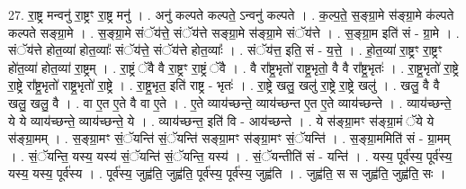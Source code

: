 \documentclass[17pt]{extarticle}
\begin{document}
27. रा॒ष्ट्र मन्वनु॑ रा॒ष्ट्रꣳ रा॒ष्ट्र मनु॑ । . अनु॑ कल्पते कल्पते॒ ऽन्वनु॑ कल्पते । . क॒ल्प॒ते॒ स॒ङ्ग्रा॒मे स॑ङ्ग्रा॒मे क॑ल्पते कल्पते सङ्ग्रा॒मे । . स॒ङ्ग्रा॒मे संॅय॑त्ते॒ संॅय॑त्ते सङ्ग्रा॒मे स॑ङ्ग्रा॒मे संॅय॑त्ते । . स॒ङ्ग्रा॒म इति॑ सं - ग्रा॒मे । . संॅय॑त्ते होत॒व्या॑ होत॒व्याः᳚ संॅय॑त्ते॒ संॅय॑त्ते होत॒व्याः᳚ । . संॅय॑त्त॒ इति॒ सं - य॒त्ते॒ । . हो॒त॒व्या॑ रा॒ष्ट्रꣳ रा॒ष्ट्रꣳ हो॑त॒व्या॑ होत॒व्या॑ रा॒ष्ट्रम् । . रा॒ष्ट्रं ॅवै वै रा॒ष्ट्रꣳ रा॒ष्ट्रं ॅवै । . वै रा᳚ष्ट्र॒भृतो॑ राष्ट्र॒भृतो॒ वै वै रा᳚ष्ट्र॒भृतः॑ । . रा॒ष्ट्र॒भृतो॑ रा॒ष्ट्रे रा॒ष्ट्रे रा᳚ष्ट्र॒भृतो॑ राष्ट्र॒भृतो॑ रा॒ष्ट्रे । . रा॒ष्ट्र॒भृत॒ इति॑ राष्ट्र - भृतः॑ । . रा॒ष्ट्रे खलु॒ खलु॑ रा॒ष्ट्रे रा॒ष्ट्रे खलु॑ । . खलु॒ वै वै खलु॒ खलु॒ वै । . वा ए॒त ए॒ते वै वा ए॒ते । . ए॒ते व्याय॑च्छन्ते॒ व्याय॑च्छन्त ए॒त ए॒ते व्याय॑च्छन्ते । . व्याय॑च्छन्ते॒ ये ये व्याय॑च्छन्ते॒ व्याय॑च्छन्ते॒ ये । . व्याय॑च्छन्त॒ इति॑ वि - आय॑च्छन्ते । . ये स॑ङ्ग्रा॒मꣳ स॑ङ्ग्रा॒मं ॅये ये स॑ङ्ग्रा॒मम् । . स॒ङ्ग्रा॒मꣳ सं॒ॅयन्ति॑ सं॒ॅयन्ति॑ सङ्ग्रा॒मꣳ स॑ङ्ग्रा॒मꣳ सं॒ॅयन्ति॑ । . स॒ङ्ग्रा॒ममिति॑ सं - ग्रा॒मम् । . सं॒ॅयन्ति॒ यस्य॒ यस्य॑ सं॒ॅयन्ति॑ सं॒ॅयन्ति॒ यस्य॑ । . सं॒ॅयन्तीति॑ सं - यन्ति॑ । . यस्य॒ पूर्व॑स्य॒ पूर्व॑स्य॒ यस्य॒ यस्य॒ पूर्व॑स्य । . पूर्व॑स्य॒ जुह्व॑ति॒ जुह्व॑ति॒ पूर्व॑स्य॒ पूर्व॑स्य॒ जुह्व॑ति । . जुह्व॑ति॒ स स जुह्व॑ति॒ जुह्व॑ति॒ सः । \newline
\end{document}
